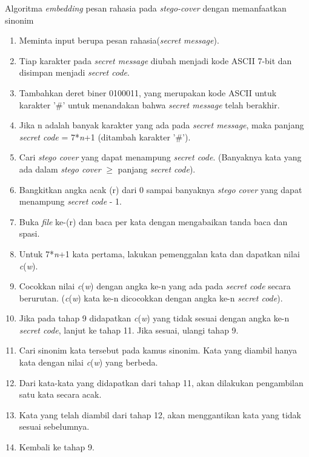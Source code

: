Algoritma \textit{embedding} pesan rahasia pada \textit{stego-cover} dengan memanfaatkan sinonim

\begin{enumerate}
	\item Meminta input berupa pesan rahasia(\textit{secret message}).
	\item Tiap karakter pada \textit{secret message} diubah menjadi kode ASCII 7-bit dan disimpan menjadi \textit{secret code}.
	\item Tambahkan deret biner 0100011, yang merupakan kode ASCII untuk karakter '\#' untuk menandakan bahwa \textit{secret message} telah berakhir.
	\item Jika n adalah banyak karakter yang ada pada \textit{secret message}, maka panjang \textit{secret code} = 7*\textit{n}+1 (ditambah karakter '\#').
	\item Cari \textit{stego cover} yang dapat menampung \textit{secret code}. (Banyaknya kata yang ada dalam \textit{stego cover} $\geq$ panjang \textit{secret code}).
	\item Bangkitkan angka acak (r) dari 0 sampai banyaknya \textit{stego cover} yang dapat menampung \textit{secret code} - 1. 
	\item Buka \textit{file} ke-(r) dan baca per kata dengan mengabaikan tanda baca dan spasi.
	\item Untuk 7*\textit{n}+1 kata pertama, lakukan pemenggalan kata dan dapatkan nilai \textit{c}(\textit{w}).
	\item Cocokkan nilai \textit{c}(\textit{w}) dengan angka ke-n yang ada pada \textit{secret code} secara berurutan. (\textit{c}(\textit{w}) kata ke-n dicocokkan dengan angka ke-n \textit{secret code}).
	\item Jika pada tahap 9 didapatkan \textit{c}(\textit{w}) yang tidak sesuai dengan angka ke-n \textit{secret code}, lanjut ke tahap 11. Jika sesuai, ulangi tahap 9.
	\item Cari sinonim kata tersebut pada kamus sinonim. Kata yang diambil hanya kata dengan nilai \textit{c}(\textit{w}) yang berbeda.
	\item Dari kata-kata yang didapatkan dari tahap 11, akan dilakukan pengambilan satu kata secara acak.
	\item Kata yang telah diambil dari tahap 12, akan menggantikan kata yang tidak sesuai sebelumnya.
	\item Kembali ke tahap 9.
\end{enumerate}

